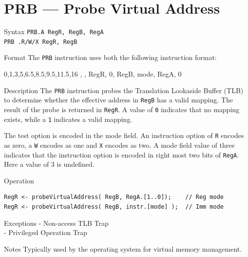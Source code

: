 %
%
\pagebreak
\section*{PRB — Probe Virtual Address}

\begin{iPageDescEntry}{Syntax}
    \texttt{PRB.A RegR, RegB, RegA} \\
    \texttt{PRB .R/W/X RegR, RegB}
\end{iPageDescEntry}

\begin{iPageDescEntry}{Format}
    The \texttt{PRB} instruction uses both the following instruction format: \\

    \begin{flushleft}
    \drawInstrFormat
        {0,1,3,5,6.5,8.5,9.5,11.5,16}
        {\OpCodeGrpSYS, \OpCodePRB, RegR, 0, RegB, mode, RegA, 0}
    \end{flushleft}
   
\end{iPageDescEntry}

\begin{iPageDescEntry}{Description}
    The \texttt{PRB} instruction probes the Translation Lookaside Buffer (TLB) 
    to determine whether the effective address in \texttt{RegB} has a valid mapping. 
    The result of the probe is returned in \texttt{RegR}. A value of \texttt{0} indicates that no mapping exists, while a \texttt{1} indicates a valid mapping.  
    
    The test option is encoded in the mode field. An instruction option of \texttt{R} encodes as zero, a \texttt{W} encodes as one and \texttt{X} encodes as two. A mode field value of three indicates that the instruction option is encoded in right most two bits of \texttt{RegA}. Here a value of 3 is undefined.
\end{iPageDescEntry}

\begin{iPageDescOpEntry}{Operation}
\begin{lstlisting}[style=iPageOpStyle]
RegR <- probeVirtualAddress( RegB, RegA.[1..0]);    // Reg mode
RegR <- probeVirtualAddress( RegB, instr.[mode] );  // Imm mode
\end{lstlisting}
\end{iPageDescOpEntry}

\begin{iPageDescEntry}{Exceptions}
    - Non-access TLB Trap \\
    - Privileged Operation Trap
\end{iPageDescEntry}

\begin{iPageDescEntry}{Notes}
    Typically used by the operating system for virtual memory management.
\end{iPageDescEntry}
